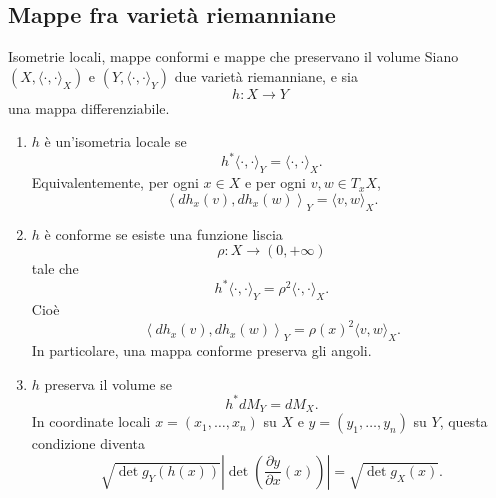 \documentclass[a4paper]{article}
\begin{document}
\subsection{Mappe fra varietà riemanniane}

\begin{snippetdefinition}{Isometrie locali, mappe conformi e mappe che preservano il volume}
Siano \((X,\langle\cdot,\cdot\rangle_X)\) e \((Y,\langle\cdot,\cdot\rangle_Y)\) due varietà riemanniane, e sia
\[
    h:X\longrightarrow Y
\]
una mappa differenziabile.

\begin{enumerate}
\item \(h\) è un'isometria locale se
\[
        h^*\langle\cdot,\cdot\rangle_Y
        =
        \langle\cdot,\cdot\rangle_X.
\]
Equivalentemente, per ogni \(x\in X\) e per ogni \(v,w\in T_xX\),
\[
        \left\langle dh_x(v),dh_x(w)\right\rangle_Y
        =
        \langle v,w\rangle_X.
\]

\item \(h\) è conforme se esiste una funzione liscia
\[
        \rho:X\longrightarrow(0,+\infty)
\]
tale che
\[
        h^*\langle\cdot,\cdot\rangle_Y
        =
        \rho^2\langle\cdot,\cdot\rangle_X.
\]
Cioè
\[
        \left\langle dh_x(v),dh_x(w)\right\rangle_Y
        =
        \rho(x)^2\langle v,w\rangle_X.
\]
In particolare, una mappa conforme preserva gli angoli.

\item \(h\) preserva il volume se
\[
        h^*dM_Y=dM_X.
\]
In coordinate locali \(x=(x_1,\ldots,x_n)\) su \(X\) e \(y=(y_1,\ldots,y_n)\) su \(Y\), questa condizione diventa
\[
        \sqrt{\det g_Y(h(x))}
        \left|\det\left(\frac{\partial y}{\partial x}(x)\right)\right|
        =
        \sqrt{\det g_X(x)}.
\]
\end{enumerate}
\end{snippetdefinition}
\end{document}
